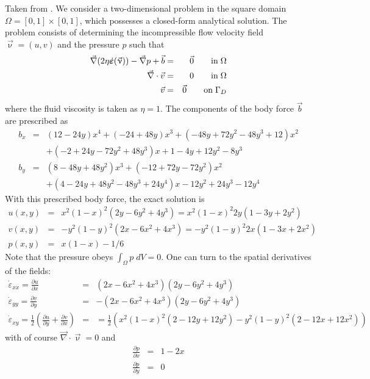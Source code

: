 Taken from \cite{dohu03}. We consider a two-dimensional problem 
in the square domain $\Omega=[0,1]\times[0,1]$, which possesses a closed-form analytical 
solution. The problem consists of determining the incompressible flow velocity field ${\vec \upnu} = (u,v)$ 
and the pressure $p$ such that 
\begin{eqnarray}
\vec\nabla (2 \eta \dot{\bm \varepsilon}({\vec \upnu})) -{\vec \nabla} p + {\vec b} &=& \vec 0 \quad\quad {\rm in} \; \Omega\\
\vec{\nabla} \cdot \vec{v} &=& 0 \quad\quad {\rm in} \; \Omega\\
\vec{v}&=&\vec{0} \quad\quad {\rm on} \; \Gamma_D
\end{eqnarray}
where the fluid viscosity is taken as $\eta=1$.
The components of the body force $\vec{b}$ are prescribed as 
\begin{eqnarray}
b_x &=& (12 - 24y) x^4 + (-24 + 48y) x^3 + (-48y + 72y^2 - 48 y^3 + 12) x^2 \nonumber\\
    && + (-2 + 24y -72y^2+48y^3)x + 1-4y + 12y^2-8y^3 \nonumber\\ 
b_y &=& (8 - 48y + 48 y^2) x^3 + (-12 + 72y - 72y^2) x^2  \nonumber\\
    && + (4 - 24y + 48y^2 - 48y^3 + 24y^4) x - 12y^2 + 24y^3 - 12y^4  \nonumber
\end{eqnarray}
With this prescribed body force, the exact solution is 
\begin{eqnarray}
u(x,y) &=& x^2(1- x)^2 (2y - 6y^2 + 4y^3) = x^2(1-x)^2 2y (1-3y+2y^2) \nonumber\\
v(x,y) &=& -y^2 (1 - y)^2 (2x - 6x^2 + 4x^3) = -y^2 (1 - y)^2 2x (1-3x+2x^2) \nonumber\\
p(x,y) &=& x(1 -x)- 1/6 \nonumber 
\end{eqnarray}
Note that the pressure obeys $\int_{\Omega} p \; dV = 0$.
One can turn to the spatial derivatives of the fields:
\begin{eqnarray}
\dot{\varepsilon}_{xx}=\frac{\partial u}{\partial x} &=&  (2x -6x^2 +4 x^3 ) (2y - 6y^2 + 4y^3)  \\
\dot{\varepsilon}_{yy}=\frac{\partial v}{\partial y} &=&  - (2x -6x^2 +4 x^3 ) (2y - 6y^2 + 4y^3)  \\
\dot{\varepsilon}_{xy}=\frac{1}{2}\left(\frac{\partial u}{\partial y}+\frac{\partial v}{\partial x}\right) 
&=&=\frac{1}{2}\left( x^2(1- x)^2 ( 2-12y+12y^2  ) -y^2 (1-y)^2 (2-12x+12x^2) \right)
\end{eqnarray}
with of course  ${\vec \nabla} \cdot {\vec \upnu} = 0$ and 
\begin{eqnarray}
\frac{\partial p}{\partial x} &=& 1-2x  \\
\frac{\partial p}{\partial y} &=& 0
\end{eqnarray}

